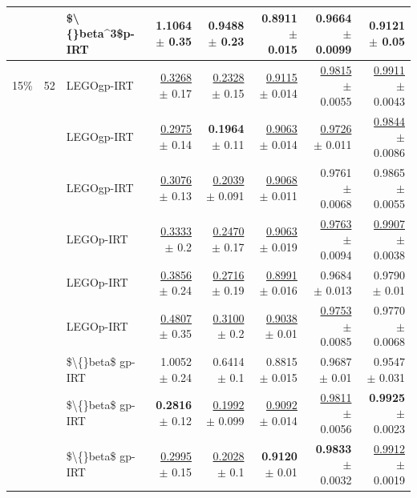 \begin{longtable}{llp{}rrrrr}
 &  & \$\textbackslash\{\}beta\textasciicircum{}3\$p-IRT & 1.1064 {\scriptsize $\pm$ 0.35} & 0.9488 {\scriptsize $\pm$ 0.23} & 0.8911 {\scriptsize $\pm$ 0.015} & 0.9664 {\scriptsize $\pm$ 0.0099} & 0.9121 {\scriptsize $\pm$ 0.05} \\
\midrule
15\% & 52 & LEGOgp-IRT & \underline{0.3268} {\scriptsize $\pm$ 0.17} & \underline{0.2328} {\scriptsize $\pm$ 0.15} & \underline{0.9115} {\scriptsize $\pm$ 0.014} & \underline{0.9815} {\scriptsize $\pm$ 0.0055} & \underline{0.9911} {\scriptsize $\pm$ 0.0043} \\
 &  & LEGOgp-IRT & \underline{0.2975} {\scriptsize $\pm$ 0.14} & \textbf{0.1964} {\scriptsize $\pm$ 0.11} & \underline{0.9063} {\scriptsize $\pm$ 0.014} & \underline{0.9726} {\scriptsize $\pm$ 0.011} & \underline{0.9844} {\scriptsize $\pm$ 0.0086} \\
 &  & LEGOgp-IRT & \underline{0.3076} {\scriptsize $\pm$ 0.13} & \underline{0.2039} {\scriptsize $\pm$ 0.091} & \underline{0.9068} {\scriptsize $\pm$ 0.011} & 0.9761 {\scriptsize $\pm$ 0.0068} & 0.9865 {\scriptsize $\pm$ 0.0055} \\
 &  & LEGOp-IRT & \underline{0.3333} {\scriptsize $\pm$ 0.2} & \underline{0.2470} {\scriptsize $\pm$ 0.17} & \underline{0.9063} {\scriptsize $\pm$ 0.019} & \underline{0.9763} {\scriptsize $\pm$ 0.0094} & \underline{0.9907} {\scriptsize $\pm$ 0.0038} \\
 &  & LEGOp-IRT & \underline{0.3856} {\scriptsize $\pm$ 0.24} & \underline{0.2716} {\scriptsize $\pm$ 0.19} & \underline{0.8991} {\scriptsize $\pm$ 0.016} & 0.9684 {\scriptsize $\pm$ 0.013} & 0.9790 {\scriptsize $\pm$ 0.01} \\
 &  & LEGOp-IRT & \underline{0.4807} {\scriptsize $\pm$ 0.35} & \underline{0.3100} {\scriptsize $\pm$ 0.2} & \underline{0.9038} {\scriptsize $\pm$ 0.01} & \underline{0.9753} {\scriptsize $\pm$ 0.0085} & 0.9770 {\scriptsize $\pm$ 0.0068} \\
 &  & \$\textbackslash\{\}beta\$ gp-IRT & 1.0052 {\scriptsize $\pm$ 0.24} & 0.6414 {\scriptsize $\pm$ 0.1} & 0.8815 {\scriptsize $\pm$ 0.015} & 0.9687 {\scriptsize $\pm$ 0.01} & 0.9547 {\scriptsize $\pm$ 0.031} \\
 &  & \$\textbackslash\{\}beta\$ gp-IRT & \textbf{0.2816} {\scriptsize $\pm$ 0.12} & \underline{0.1992} {\scriptsize $\pm$ 0.099} & \underline{0.9092} {\scriptsize $\pm$ 0.014} & \underline{0.9811} {\scriptsize $\pm$ 0.0056} & \textbf{0.9925} {\scriptsize $\pm$ 0.0023} \\
 &  & \$\textbackslash\{\}beta\$ gp-IRT & \underline{0.2995} {\scriptsize $\pm$ 0.15} & \underline{0.2028} {\scriptsize $\pm$ 0.1} & \textbf{0.9120} {\scriptsize $\pm$ 0.01} & \textbf{0.9833} {\scriptsize $\pm$ 0.0032} & \underline{0.9912} {\scriptsize $\pm$ 0.0019} \\

\end{longtable}
